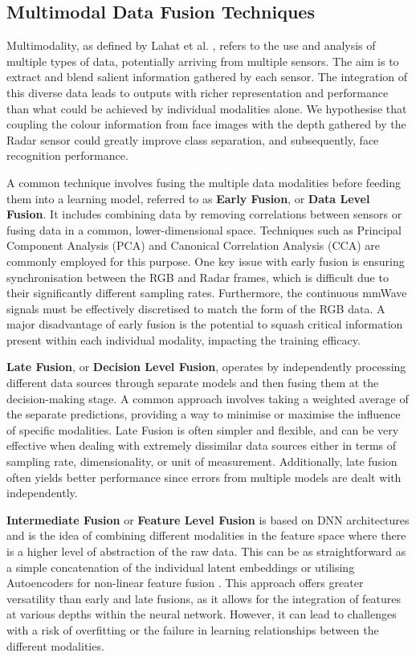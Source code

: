 \documentclass{interim}
\begin{document}
\subsection{Multimodal Data Fusion Techniques}
Multimodality, as defined by Lahat et al. \cite{lahat2015multimodal}, refers to the use and analysis of multiple types of data, potentially arriving from multiple sensors. The aim is to extract and blend salient information gathered by each sensor. The integration of this diverse data leads to outputs with richer representation and performance than what could be achieved by individual modalities alone. We hypothesise that coupling the colour information from face images with the depth gathered by the Radar sensor could greatly improve class separation, and subsequently, face recognition performance.

A common technique involves fusing the multiple data modalities before feeding them into a learning model, referred to as \textbf{Early Fusion}, or \textbf{Data Level Fusion}. It includes combining data by removing correlations between sensors or fusing data in a common, lower-dimensional space. Techniques such as Principal Component Analysis (PCA) and Canonical Correlation Analysis (CCA) are commonly employed for this purpose. One key issue with early fusion is ensuring synchronisation between the RGB and Radar frames, which is difficult due to their significantly different sampling rates. Furthermore, the continuous mmWave signals must be effectively discretised to match the form of the RGB data. A major disadvantage of early fusion is the potential to squash critical information present within each individual modality, impacting the training efficacy.

\textbf{Late Fusion}, or \textbf{Decision Level Fusion}, operates by independently processing different data sources through separate models and then fusing them at the decision-making stage. A common approach involves taking a weighted average of the separate predictions, providing a way to minimise or maximise the influence of specific modalities. Late Fusion is often simpler and flexible, and can be very effective when dealing with extremely dissimilar data sources either in terms of sampling rate, dimensionality, or unit of measurement. Additionally, late fusion often yields better performance since errors from multiple models are dealt with independently.

\textbf{Intermediate Fusion} or \textbf{Feature Level Fusion} is based on DNN architectures and is the idea of combining different modalities in the feature space where there is a higher level of abstraction of the raw data. This can be as straightforward as a simple concatenation of the individual latent embeddings or utilising Autoencoders for non-linear feature fusion \cite{charte2018practical}. This approach offers greater versatility than early and late fusions, as it allows for the integration of features at various depths within the neural network. However, it can lead to challenges with a risk of overfitting or the failure in learning relationships between the different modalities.
\end{document}
